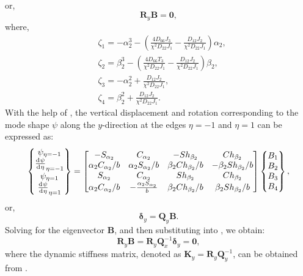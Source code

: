 \documentclass[preprint,12pt]{elsarticle}
\newcommand{\id}{\mathrm{d}\mkern1mu}
\begin{document}
%
or,
%
\begin{equation}\label{eq:ABy1}
	\mathbf{R}_y \mathbf{B} = \mathbf{0},
\end{equation}
%
where,
%
\begin{equation}\label{eq:gammay}
	\begin{split}
		&\zeta_1=-\alpha_2^3-\left( \frac{4D_{66}J_3}{\chi^2D_{22}J_1}  - \frac{D_{12}J_2}{\chi^2D_{22}J_1}  \right)\alpha_2,\\
		&\zeta_2=\beta_2^3-\left( \frac{4D_{66}T_3}{\chi^2D_{22}J_1}  - \frac{D_{12}J_2}{\chi^2D_{22}J_1}  \right)\beta_2,\\
		&\zeta_3=-\alpha_2^2+\frac{D_{12}J_2}{\chi^2D_{22}J_1},\\
		&\zeta_4=\beta_2^2+\frac{D_{12}J_2}{\chi^2D_{22}J_1}.
	\end{split}
\end{equation}
%
With the help of , the vertical displacement and rotation corresponding to the mode shape $\psi$ along the $y$-direction at the edges $\eta = -1$ and $\eta = 1$ can be expressed as:
%
\begin{equation}\label{eq:UBy}
	\begin{split}
		\begin{Bmatrix}
			\psi_{\eta=-1}\\\frac{\id \psi}{\id \eta}_{\eta=-1}\\\psi_{\eta=1}\\\frac{\id \psi}{\id \eta}_{\eta=1}
		\end{Bmatrix}
		= \begin{bmatrix}
			-S_{\alpha_2} & C_{\alpha_2} & -Sh_{\beta_2} & Ch_{\beta_2} \\
			\alpha_2 C_{\alpha_2}/b & \alpha_2 S_{\alpha_2}/b & \beta_2 Ch_{\beta_2}/b & -\beta_2 Sh_{\beta_2}/b \\
			S_{\alpha_2} & C_{\alpha_2} & Sh_{\beta_2} & Ch_{\beta_2} \\
			\alpha_2 C_{\alpha_2}/b & -\frac{\alpha_2 S_{\alpha_2}}{b} & \beta_2 Ch_{\beta_2}/b & \beta_2 Sh_{\beta_2}/b
		\end{bmatrix}
		\begin{Bmatrix}
			B_1\\B_2\\B_3\\B_4
		\end{Bmatrix},		
	\end{split}
\end{equation}
%
or,
%
\begin{equation}\label{eq:UBy1}
	\mathbf{\delta}_y= \mathbf{Q}_y\mathbf{B}.
\end{equation}
%
Solving for the eigenvector $\mathbf{B}$, and then substituting into , we obtain:
%
\begin{equation}\label{eq:DSM_eqy}
	\mathbf{R}_y\mathbf{B}=\mathbf{R}_y \mathbf{Q}_x^{-1} 
	\mathbf{\delta}_y = \mathbf{0},
\end{equation}
%
where the dynamic stiffness matrix, denoted as $\mathbf{K}_y = \mathbf{R}_y \mathbf{Q}_y^{-1}$, can be obtained from .
\end{document}
